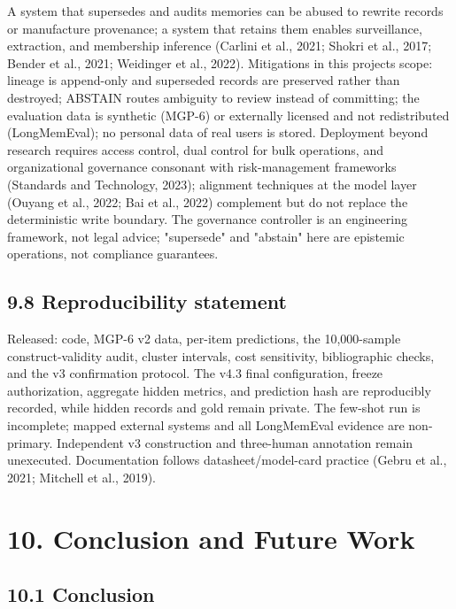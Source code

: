A system that supersedes and audits memories can be abused to rewrite
records or manufacture provenance; a system that retains them enables
surveillance, extraction, and membership inference (Carlini et al.,
2021; Shokri et al., 2017; Bender et al., 2021; Weidinger et al., 2022).
Mitigations in this project\textquotesingle s scope: lineage is
append-only and superseded records are preserved rather than destroyed;
ABSTAIN routes ambiguity to review instead of committing; the evaluation
data is synthetic (MGP-6) or externally licensed and not redistributed
(LongMemEval); no personal data of real users is stored. Deployment
beyond research requires access control, dual control for bulk
operations, and organizational governance consonant with risk-management
frameworks (Standards and Technology, 2023); alignment techniques at the
model layer (Ouyang et al., 2022; Bai et al., 2022) complement but do
not replace the deterministic write boundary. The governance controller
is an engineering framework, not legal advice; "supersede" and "abstain"
here are epistemic operations, not compliance guarantees.

\subsection{9.8 Reproducibility
statement}\label{reproducibility-statement}

Released: code, MGP-6 v2 data, per-item predictions, the 10,000-sample
construct-validity audit, cluster intervals, cost sensitivity,
bibliographic checks, and the v3 confirmation protocol. The v4.3 final
configuration, freeze authorization, aggregate hidden metrics, and
prediction hash are reproducibly recorded, while hidden records and gold
remain private. The few-shot run is incomplete; mapped external systems
and all LongMemEval evidence are non-primary. Independent v3
construction and three-human annotation remain unexecuted. Documentation
follows datasheet/model-card practice (Gebru et al., 2021; Mitchell et
al., 2019).

\section{10. Conclusion and Future
Work}\label{conclusion-and-future-work}

\subsection{10.1 Conclusion}\label{conclusion}

